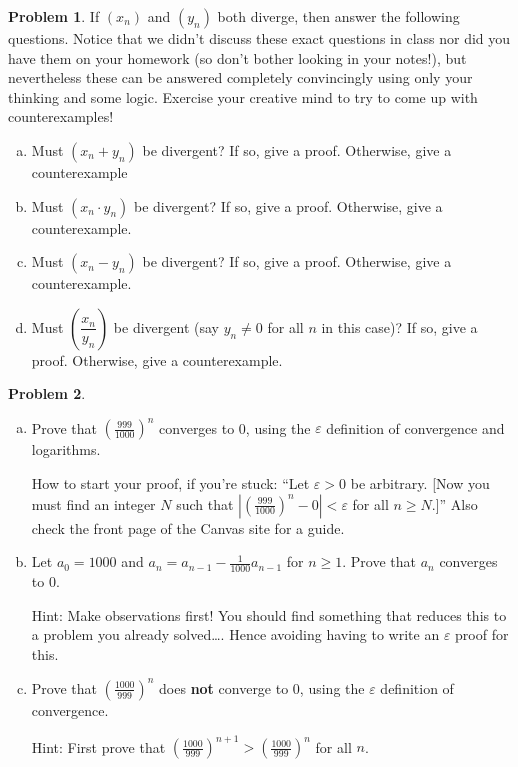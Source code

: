 \documentclass[11pt,oneside]{amsart}
\theoremstyle{definition}
\newtheorem{problem}{Problem}
\newcommand{\eps}{\varepsilon}
\begin{document}
\begin{problem}
If $(x_n)$ and $(y_n)$ both diverge, then answer the following questions. Notice that we didn't discuss these exact questions in class nor did you have them on your homework (so don't bother looking in your notes!), but nevertheless these can be answered completely convincingly using only your thinking and some logic. Exercise your creative mind to try to come up with counterexamples!
\begin{enumerate}[(a)]
  \item Must $(x_n+y_n)$ be divergent? If so, give a proof. Otherwise, give a counterexample
  \item Must $(x_n \cdot y_n)$ be divergent? If so, give a proof. Otherwise, give a counterexample.
  \item Must $(x_n-y_n)$ be divergent? If so, give a proof. Otherwise, give a counterexample.
  \item Must $\left(\dfrac{x_n}{y_n}\right)$ be divergent (say $y_n \not = 0$ for all $n$ in this case)? If so, give a proof. Otherwise, give a counterexample.
\end{enumerate}
\end{problem}

\begin{problem}
\leavevmode\begin{enumerate}[(a)]
  \item Prove that $\left(\frac{999}{1000}\right)^n$ converges to 0, using the $\eps$ definition of convergence and logarithms.

        How to start your proof, if you're stuck: ``Let $\eps>0$ be arbitrary. [Now you must find an integer $N$ such that $\left|\left(\frac{999}{1000}\right)^n-0\right|<\eps$ for all $n\geq N$.]'' Also check the front page of the Canvas site for a guide.

  \item Let $a_0=1000$ and $a_n=a_{n-1}-\frac 1{1000}a_{n-1}$ for $n\geq 1$. Prove that $a_n$ converges to 0.

        Hint: Make observations first! You should find something that reduces this to a problem you already solved\ldots. Hence avoiding having to write an $\eps$ proof for this.

  \item Prove that $\left(\frac{1000}{999}\right)^n$ does \textbf{not} converge to 0, using the $\eps$ definition of convergence.

        Hint: First prove that $\left(\frac{1000}{999}\right)^{n+1}>\left(\frac{1000}{999}\right)^n$ for all $n$.
\end{enumerate}
\end{problem}
\end{document}
